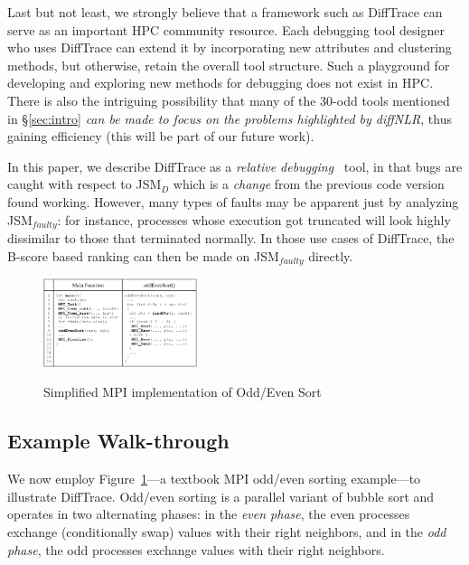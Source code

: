 Last but not least,
we strongly believe that a framework such as DiffTrace can
serve as an important HPC community resource.
%
Each debugging tool designer who uses DiffTrace can extend
it by incorporating new attributes and clustering methods, but
otherwise, retain the overall tool structure.
%
Such a playground for developing and exploring new methods for
debugging does not exist in HPC.
%
There is also the intriguing possibility that 
many of the 30-odd tools mentioned in \S\ref{sec:intro}
{\em can be made to focus on the problems highlighted
  by diffNLR}, thus gaining efficiency (this will be part of our future work).


In this paper, we describe DiffTrace as a
{\em relative debugging}~\cite{relative-debugging}
tool, in that bugs are caught with respect
to JSM$_{D}$ which is a {\em change} from
the previous code version found working.
%
However, many types of faults may be apparent
just by analyzing JSM$_{faulty}$: for instance,
processes whose execution got truncated 
will look highly dissimilar to those that
terminated normally.
%
In those use cases of DiffTrace,
the B-score based ranking can then be made
on JSM$_{faulty}$ directly.





\begin{figure}[]
\centering
\caption{Simplified MPI implementation of Odd/Even Sort}
\includegraphics[width=0.40\textwidth]{figs/oddEven.png}
\label{fig.oddEven}
\end{figure}


\subsection{Example Walk-through}

We now employ
Figure~\ref{fig.oddEven}---a textbook MPI odd/even sorting example---to
illustrate DiffTrace.
%
Odd/even sorting is a parallel variant
of bubble sort
and operates in two alternating phases:
in the \textit{even phase}, the even processes exchange (conditionally swap)
values with their right neighbors, and in the \textit{odd phase},
the odd processes exchange values with their right neighbors.
%

